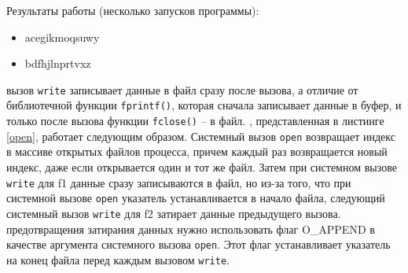 \documentclass[12pt]{report}
\begin{document}
Результаты работы (несколько запусков программы): 
\begin{itemize}
	\item acegikmoqsuwy
	\item bdfhjlnprtvxz
\end{itemize}

 вызов \texttt{write} записывает данные в файл сразу после вызова, а отличие от библиотечной функции \texttt{fprintf()}, которая сначала записывает данные в буфер, и только после вызова функции \texttt{fclose()} -- в файл. 
, представленная в листинге \ref{open}, работает следующим образом. Системный вызов \texttt{open} возвращает индекс в массиве открытых файлов процесса, причем каждый раз возвращается новый индекс, даже если открывается один и тот же файл. Затем при системном вызове \texttt{write} для f1 данные сразу записываются в файл, но из-за того, что при системной вызове \texttt{open} указатель устанавливается в начало файла, следующий системный вызов \texttt{write} для f2 затирает данные предыдущего вызова.
 предотвращения затирания данных нужно использовать флаг O\_APPEND в качестве аргумента системного вызова \texttt{open}. Этот флаг устанавливает указатель на конец файла перед каждым вызовом \texttt{write}.
\end{document}

